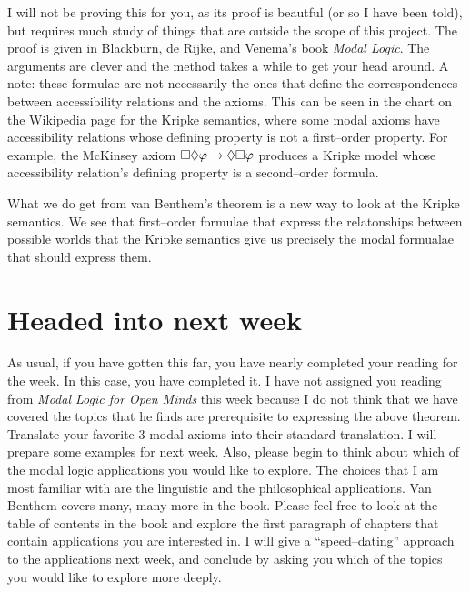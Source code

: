 \bigskip

\noindent{}
\bigskip

I will not be proving this for you, as its proof is beautful (or so I have been told), but requires much study of things that
are outside the scope of this project. The proof is given in Blackburn, de Rijke, and Venema's book \emph{Modal Logic}. The
arguments are clever and the method takes a while to get your head around. A note: these formulae are not necessarily the
ones that define the correspondences between accessibility relations and the axioms. This can be seen in the chart
on the Wikipedia page for the Kripke semantics, where some modal axioms have accessibility relations whose defining property
is not a first--order property. For example, the McKinsey axiom $\square \lozenge \varphi \rightarrow \lozenge \square \varphi$
produces a Kripke model whose accessibility relation's defining property is a second--order formula.

What we do get from van Benthem's theorem is a new way to look at the Kripke semantics. We see that first--order formulae that
express the relatonships between possible worlds that the Kripke semantics give us precisely the modal formualae that 
should express them.

\section{Headed into next week}
As usual, if you have gotten this far, you have nearly completed your reading for the week.
In this case, you have completed it. I have not assigned you reading from \emph{Modal Logic for Open Minds} this week
because I do not think that we have covered the topics that he finds are prerequisite to expressing the above theorem.
Translate your favorite 3 modal axioms into their standard translation. I will prepare some examples for next week.
Also, please begin to think about which of the modal logic applications you would like to explore. The choices that I am most
familiar with are the linguistic and the philosophical applications. Van Benthem covers many, many more in the book. Please
feel free to look at the table of contents in the book and explore the first paragraph of chapters that contain applications
you are interested in. I will give a ``speed--dating'' approach to the applications next week, and conclude by asking you
which of the topics you would like to explore more deeply. 
